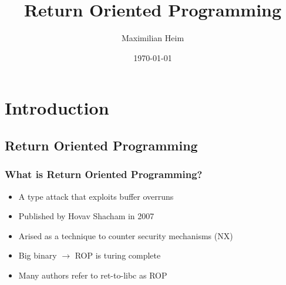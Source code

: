 \documentclass[11pt]{beamer}
\author{Maximilian Heim}
\title{Return Oriented Programming}
\institute{University Albstadt-Sigmaringen}
\date{\today}
\begin{document}
\begin{frame}
\titlepage
\end{frame}

\begin{frame}
\tableofcontents
\end{frame}

\section{Introduction}
\subsection{Return Oriented Programming}
\begin{frame}
    \frametitle{What is Return Oriented Programming?}
    \begin{itemize}
    \item A type attack that exploits buffer overruns
    \item Published by Hovav Shacham in 2007
    \item Arised as a technique to counter security mechanisms (NX)
    \item Big binary $\rightarrow$ ROP is turing complete
    \item Many authors refer to ret-to-libc as ROP
    \end{itemize}
\end{frame}
\end{document}
